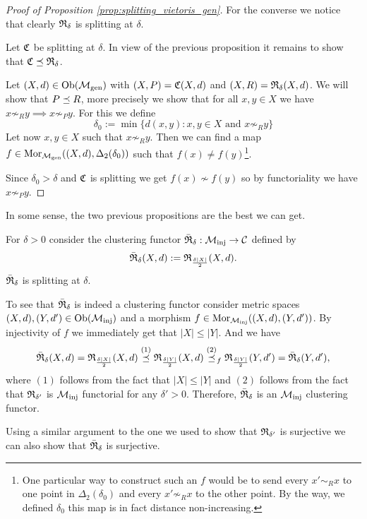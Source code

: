 \begin{proof}[Proof of Proposition \ref{prop:splitting_vietoris_gen}]
    For the converse we notice that clearly $\mathfrak{R}_\delta$ is splitting at $\delta$.

    \medskip
    Let $\mathfrak{C}$ be splitting at $\delta$. In view of the previous proposition it remains to show that $\mathfrak{C} \preceq \mathfrak{R}_\delta$.
        
    Let $(X,d) \in \mathrm {Ob}({\mathcal{M}_\mathrm{gen}})$ with $(X,P) = \mathfrak{C}(X,d)$ and $(X,R) = \mathfrak{R}_\delta(X,d)$. We will show that $P \preceq R$, more precisely we show that for all $x,y \in X$ we have $x \not\sim_R y \implies x \not\sim_P y$. For this we define
    $$
    \delta_0 := \min\{d(x,y): x,y \in X \text{ and } x \not\sim_R y\}
    $$
    Let now $x,y \in X$ such that $x \not\sim_R y$.
    Then we can find a map $f \in \mathrm {Mor}_{\mathcal{M}_\mathrm{gen}}((X,d), \Delta_2(\delta_0))$ such that $f(x) \neq f(y)$\footnote{One particular way to construct such an $f$ would be to send every $x' \sim_R x$ to one point in $\Delta_2(\delta_0)$ and every $x' \not\sim_R x$ to the other point. By the way, we defined $\delta_0$ this map is in fact distance non-increasing.}.

    Since $\delta_0 > \delta$ and $\mathfrak{C}$ is splitting we get $f(x) \not\sim f(y)$ so by functoriality we have $x \not\sim_P y$.
\end{proof}

\begin{example}{}{}
In some sense, the two previous propositions are the best we can get. 

For $\delta>0$ consider the clustering functor $\bar{\mathfrak{R}}_\delta: {\mathcal{M}_\mathrm{inj}} \to \mathcal{C}$ defined by
$$
\bar{\mathfrak{R}}_\delta(X,d) := \mathfrak{R}_{\frac{\delta|X|}{2}}(X,d).
$$
$\bar{\mathfrak{R}}_\delta$ is splitting at $\delta$.

\medskip
To see that $\bar{\mathfrak{R}}_\delta$ is indeed a clustering functor consider metric spaces $(X,d), (Y,d') \in \mathrm {Ob}({\mathcal{M}_\mathrm{inj}})$ and a morphism $f \in \mathrm {Mor}_{\mathcal{M}_\mathrm{inj}}((X,d), (Y,d'))$. By injectivity of $f$ we immediately get that $|X| \le |Y|$. And we have
$$
\bar{\mathfrak{R}}_\delta(X,d) = \mathfrak{R}_{\frac{\delta|X|}{2}}(X,d) \overset{(1)}{\preceq} \mathfrak{R}_{\frac{\delta|Y|}{2}}(X,d) \overset{(2)}{\preceq}_f \mathfrak{R}_{\frac{\delta|Y|}{2}}(Y,d') = \bar{\mathfrak{R}}_\delta(Y,d'),
$$
where $(1)$ follows from the fact that $|X| \le |Y|$ and $(2)$ follows from the fact that $\mathfrak{R}_{\delta'}$ is ${\mathcal{M}_\mathrm{inj}}$ functorial for any $\delta' > 0$. Therefore, $\bar{\mathfrak{R}}_\delta$ is an ${\mathcal{M}_\mathrm{inj}}$ clustering functor.

\medskip
Using a similar argument to the one we used to show that $\mathfrak{R}_{\delta'}$ is surjective we can also show that $\bar{\mathfrak{R}}_\delta$ is surjective.

\end{example}

